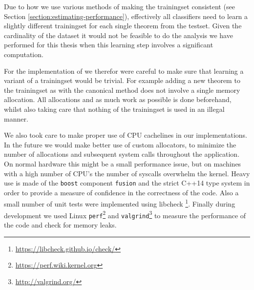 Due to how we use various methods of making the trainingset consistent (see Section \ref{section:estimating-performance}), effectively
all classifiers need to learn a slightly different trainingset for each single theorem from the testset.
Given the cardinality of the dataset it would not be feasible to do the analysis
we have performed for this thesis when this learning step involves a significant computation.

For the implementation of \roerei we therefor were careful to make sure that learning a variant of a trainingset would be trivial.
For example adding a new theorem to the trainingset as with the canonical method does not involve a single memory allocation.
All allocations and as much work as possible is done beforehand, whilst also taking care that nothing of the trainingset is used
in an illegal manner.

We also took care to make proper use of CPU cachelines in our implementations.
In the future we would make better use of custom allocators, to minimize the number of allocations and subsequent system calls throughout the application.
On normal hardware this might be a small performance issue, but on machines with a high number of CPU's the number of syscalls overwhelm the kernel.
Heavy use is made of the \texttt{boost} component \texttt{fusion} and the strict C++14 type system in order to provide a measure of
confidence in the correctness of the code.
Also a small number of unit tests were implemented using libcheck \footnote{\url{https://libcheck.github.io/check/}}.
Finally during development we used Linux \texttt{perf}\footnote{\url{https://perf.wiki.kernel.org}} and \texttt{valgrind}\footnote{\url{http://valgrind.org/}}
to measure the performance of the code and check for memory leaks.
